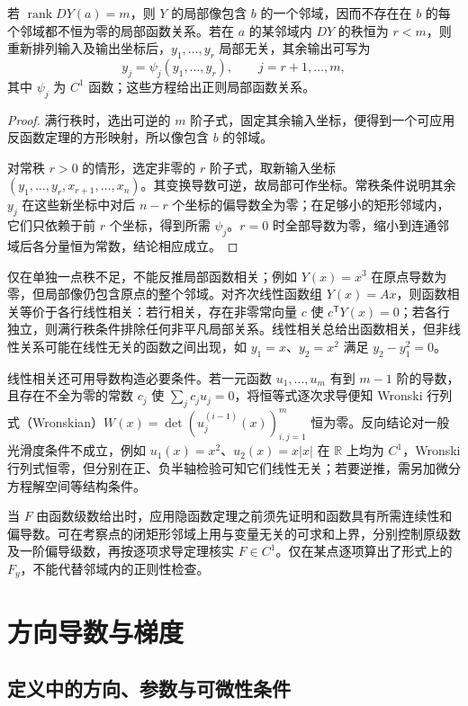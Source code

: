 \begin{theorem}
\label{thm:pei-functional-rank}
若 $\operatorname{rank}DY(a)=m$，则 $Y$ 的局部像包含 $b$ 的一个邻域，因而不存在在 $b$ 的每个邻域都不恒为零的局部函数关系。若在 $a$ 的某邻域内 $DY$ 的秩恒为 $r<m$，则重新排列输入及输出坐标后，$y_1,\ldots,y_r$ 局部无关，其余输出可写为
\[
y_j=\psi_j(y_1,\ldots,y_r),\qquad j=r+1,\ldots,m,
\]
其中 $\psi_j$ 为 $C^1$ 函数；这些方程给出正则局部函数关系。
\end{theorem}
\begin{proof}
满行秩时，选出可逆的 $m$ 阶子式，固定其余输入坐标，便得到一个可应用反函数定理的方形映射，所以像包含 $b$ 的邻域。

对常秩 $r>0$ 的情形，选定非零的 $r$ 阶子式，取新输入坐标 $(y_1,\ldots,y_r,x_{r+1},\ldots,x_n)$。其变换导数可逆，故局部可作坐标。常秩条件说明其余 $y_j$ 在这些新坐标中对后 $n-r$ 个坐标的偏导数全为零；在足够小的矩形邻域内，它们只依赖于前 $r$ 个坐标，得到所需 $\psi_j$。$r=0$ 时全部导数为零，缩小到连通邻域后各分量恒为常数，结论相应成立。
\end{proof}

仅在单独一点秩不足，不能反推局部函数相关；例如 $Y(x)=x^3$ 在原点导数为零，但局部像仍包含原点的整个邻域。对齐次线性函数组 $Y(x)=Ax$，则函数相关等价于各行线性相关：若行相关，存在非零常向量 $c$ 使 $c^{\mathsf T}Y(x)=0$；若各行独立，则满行秩条件排除任何非平凡局部关系。线性相关总给出函数相关，但非线性关系可能在线性无关的函数之间出现，如 $y_1=x$、$y_2=x^2$ 满足 $y_2-y_1^2=0$。

线性相关还可用导数构造必要条件。若一元函数 $u_1,\ldots,u_m$ 有到 $m-1$ 阶的导数，且存在不全为零的常数 $c_j$ 使 $\sum_jc_ju_j=0$，将恒等式逐次求导便知 Wronski 行列式（Wronskian）$W(x)=\det(u_j^{(i-1)}(x))_{i,j=1}^m$ 恒为零。反向结论对一般光滑度条件不成立，例如 $u_1(x)=x^2$、$u_2(x)=x|x|$ 在 $\mathbb R$ 上均为 $C^1$，Wronski 行列式恒零，但分别在正、负半轴检验可知它们线性无关；若要逆推，需另加微分方程解空间等结构条件。

当 $F$ 由函数级数给出时，应用隐函数定理之前须先证明和函数具有所需连续性和偏导数。可在考察点的闭矩形邻域上用与变量无关的可求和上界，分别控制原级数及一阶偏导级数，再按逐项求导定理核实 $F\in C^1$。仅在某点逐项算出了形式上的 $F_y$，不能代替邻域内的正则性检查。

\section{方向导数与梯度}
\label{sec:pei-directions-gradients}

\subsection{定义中的方向、参数与可微性条件}

